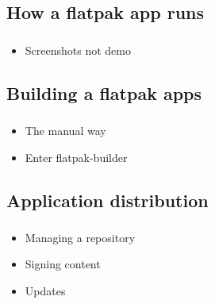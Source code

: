 \subsection{How a flatpak app runs}
\begin{frame}
  \frametitle{\insertsubsection}

    \begin{itemize}
      \item Screenshots not demo\vspacing
    \end{itemize}
\end{frame}

\subsection{Building a flatpak apps}
\begin{frame}
  \frametitle{\insertsubsection}

    \begin{itemize}
      \item The manual way\vspacing
      \item Enter flatpak-builder\vspacing
    \end{itemize}
\end{frame}

\subsection{Application distribution}
\begin{frame}
  \frametitle{\insertsubsection}

    \begin{itemize}
      \item Managing a repository\vspacing
      \item Signing content\vspacing
      \item Updates\vspacing
    \end{itemize}
\end{frame}
